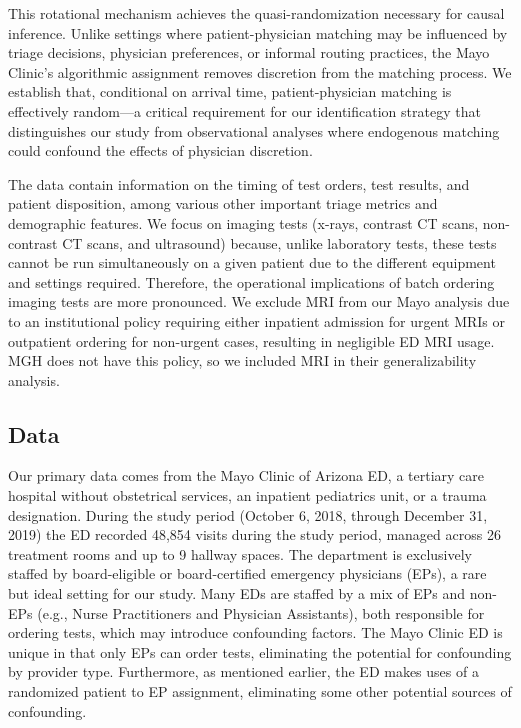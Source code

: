\documentclass[,,nonblindrev]{informs}
\begin{document}
This rotational mechanism achieves the quasi-randomization necessary for
causal inference. Unlike settings where patient-physician matching may
be influenced by triage decisions, physician preferences, or informal
routing practices, the Mayo Clinic's algorithmic assignment removes
discretion from the matching process. We establish that, conditional on
arrival time, patient-physician matching is effectively random---a
critical requirement for our identification strategy that distinguishes
our study from observational analyses where endogenous matching could
confound the effects of physician discretion.

The data contain information on the timing of test orders, test results,
and patient disposition, among various other important triage metrics
and demographic features. We focus on imaging tests (x-rays, contrast CT
scans, non-contrast CT scans, and ultrasound) because, unlike laboratory
tests, these tests cannot be run simultaneously on a given patient due
to the different equipment and settings required. Therefore, the
operational implications of batch ordering imaging tests are more
pronounced. We exclude MRI from our Mayo analysis due to an
institutional policy requiring either inpatient admission for urgent
MRIs or outpatient ordering for non-urgent cases, resulting in
negligible ED MRI usage. MGH does not have this policy, so we included
MRI in their generalizability analysis.

\subsection{Data}\label{data}

Our primary data comes from the Mayo Clinic of Arizona ED, a tertiary
care hospital without obstetrical services, an inpatient pediatrics
unit, or a trauma designation. During the study period (October 6, 2018,
through December 31, 2019) the ED recorded 48,854 visits during the
study period, managed across 26 treatment rooms and up to 9 hallway
spaces. The department is exclusively staffed by board-eligible or
board-certified emergency physicians (EPs), a rare but ideal setting for
our study. Many EDs are staffed by a mix of EPs and non-EPs (e.g., Nurse
Practitioners and Physician Assistants), both responsible for ordering
tests, which may introduce confounding factors. The Mayo Clinic ED is
unique in that only EPs can order tests, eliminating the potential for
confounding by provider type. Furthermore, as mentioned earlier, the ED
makes uses of a randomized patient to EP assignment, eliminating some
other potential sources of confounding.
\end{document}

